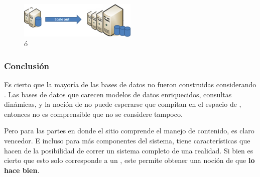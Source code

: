 \begin{figure}[h!]
	\centering
	\includegraphics[width=0.5\textwidth]{figuras/cap2/scale_out.png}
	\caption{\horizontalScalingDB ó \scalingOutDB }
	\label{figure:figure_scale_out}
\end{figure}

\subsubsection{Conclusión}

Es cierto que la mayoría de las bases de datos \nosqlNAME no fueron construidas considerando \ecommerce. Las bases de datos que carecen modelos de datos enriquecidos, consultas dinámicas, y la noción de \transactionalityDB no puede esperarse que compitan en el espacio de \ecommerce, entonces no es comprensible que no se considere \mongodbNAME tampoco.

Pero para las partes en donde el sitio \ecommerce comprende el manejo de contenido, \mongodbNAME es claro vencedor. E incluso para más componentes \transactionalDB del sistema, \mongodbNAME tiene características que hacen de la posibilidad de correr un sistema completo de \ecommerce una realidad. Si bien es cierto que esto solo corresponde a un \sketchCPT, este permite obtener una noción de que \textbf{\documentsDB \dataBaseDB lo hace bien}.


\section{\nodejsNAME}\label{cap:section:nodejs}


